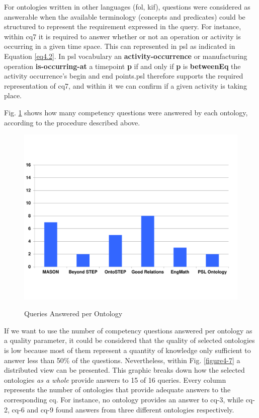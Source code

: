 For ontologies written in other languages (\gls{fol}, \gls{kif}), questions were considered as answerable when the available terminology (concepts and predicates) could be structured to represent the requirement expressed in the query. For instance,   within \gls{cq}7 it is required to answer whether or not an operation or activity is occurring in a given time space. This can represented in \gls{psl} as indicated in Equation \ref{eq4.2}. In \gls{psl} vocabulary an \textbf{activity-occurrence} or manufacturing operation \textbf{is-occurring-at} a timepoint \textbf{p} if and only if \textbf{p} is \textbf{betweenEq} the activity occurrence’s begin and end points.\gls{psl} therefore supports the required representation of \gls{cq}7, and within it we can confirm if a given activity is taking place.



Fig. \ref{figure4-6} shows how many competency   questions were answered by each ontology, according to the procedure described above. 



\begin{figure}
	\begin{center}
		\includegraphics[scale=0.5]{figure-chapterIV/fig4-6.pdf}\\
		\caption{Queries Answered per Ontology}
		\label{figure4-6}
	\end{center}
\end{figure}



If we want to use the number of competency questions answered per ontology as a quality parameter, it could be considered that the quality of selected ontologies is low because most of them represent a quantity of knowledge only sufficient to answer less than 50\% of the questions. Nevertheless, within Fig. \ref{figure4-7} a distributed view can be presented. This graphic breaks down how the selected ontologies \textit{as a whole} provide answers to 15 of 16 queries. Every column represents the number of ontologies that provide adequate answers to the corresponding \gls{cq}. For instance, no ontology provides an answer to \gls{cq}-3, while \gls{cq}-2, \gls{cq}-6 and \gls{cq}-9 found answers from three different ontologies respectively. 


